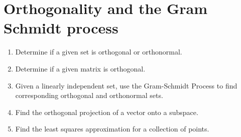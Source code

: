 \section{Orthogonality and the Gram Schmidt process}

\begin{outcome}
  \begin{enumerate}
  \item Determine if a given set is orthogonal or orthonormal.
  \item Determine if a given matrix is orthogonal.
  \item Given a linearly independent set, use the Gram-Schmidt Process
    to find corresponding orthogonal and orthonormal sets.
  \item Find the orthogonal projection of a vector onto a subspace.
  \item Find the least squares approximation for a collection of
    points.
  \end{enumerate}
\end{outcome}
